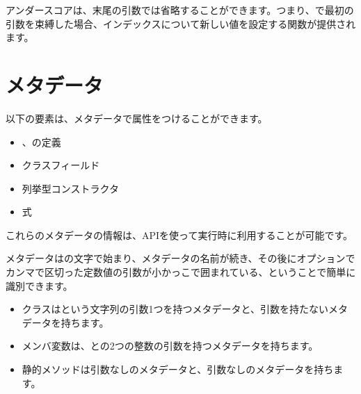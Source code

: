 アンダースコア\expr{_}は、末尾の引数では省略することができます。つまり、で最初の引数を束縛した場合、インデックスについて新しい値を設定する関数が提供されます。


\section{メタデータ}
\label{lf-metadata}

以下の要素は、メタデータで属性をつけることができます。

\begin{itemize}
	\item {}、の定義
	\item クラスフィールド
	\item 列挙型コンストラクタ
	\item 式
\end{itemize}

これらのメタデータの情報は、APIを使って実行時に利用することが可能です。


メタデータはの文字で始まり、メタデータの名前が続き、その後にオプションでカンマで区切った定数値の引数が小かっこで囲まれている、ということで簡単に識別できます。

\begin{itemize}
	\item {}クラスはという文字列の引数1つを持つメタデータと、引数を持たないメタデータを持ちます。
	\item メンバ変数は、との2つの整数の引数を持つメタデータを持ちます。
	\item 静的メソッドは引数なしのメタデータと、引数なしのメタデータを持ちます。
\end{itemize}

